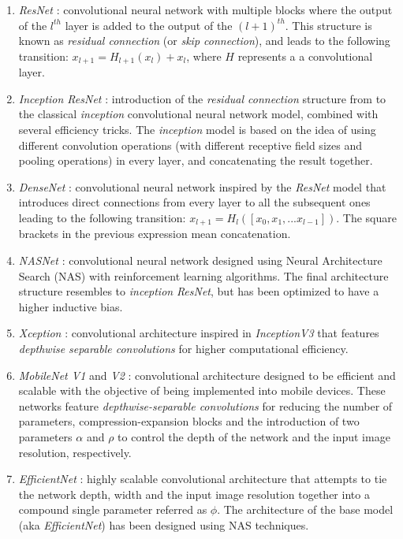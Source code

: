 \documentclass{elsarticle}
\begin{document}
    \begin{enumerate}
    	\item \textit{ResNet} \citep{he2016}: convolutional neural network with multiple blocks where the output of the $l^{th}$ layer is added to the output of the $(l+1)^{th}$. This structure is known as \textit{residual connection} (or \textit{skip connection}), and leads to the following transition: $x_{l+1} = H_{l+1}(x_{l}) + x_l$, where $H$ represents a a convolutional layer.
    	\item \textit{Inception ResNet} \citep{szegedy2017}: introduction of the \textit{residual connection} structure from \citep{he2016} to the classical \textit{inception} convolutional neural network model, combined with several efficiency tricks. The \textit{inception} model is based on the idea of using different convolution operations (with different receptive field sizes and pooling operations) in every layer, and concatenating the result together.
    	\item \textit{DenseNet} \citep{huang2017}: convolutional neural network inspired by the \textit{ResNet} model \citep{he2016} that introduces direct connections from every layer to all the subsequent ones leading to the following transition: $x_{l+1} = H_l([x_0, x_1, ... x_{l-1}])$. The square brackets in the previous expression mean concatenation.
    	\item \textit{NASNet} \citep{pham2018}: convolutional neural network designed using Neural Architecture Search (NAS) with reinforcement learning algorithms. The final architecture structure resembles to \textit{inception} \textit{ResNet}, but has been optimized to have a higher inductive bias.
    	\item \textit{Xception} \citep{chollet2017}: convolutional architecture inspired in \textit{InceptionV3}  \citep{szegedy2016} that features \textit{depthwise separable convolutions} for higher computational efficiency.
    	\item \textit{MobileNet V1} and \textit{V2} \citep{howard2017, sandler2018}: convolutional architecture designed to be efficient and scalable with the objective of being implemented into mobile devices. These networks feature \textit{depthwise-separable convolutions} for reducing the number of parameters, compression-expansion blocks and the introduction of two parameters $\alpha$ and $\rho$ to control the depth of the network and the input image resolution, respectively.
    	\item \textit{EfficientNet} \citep{tan2019}: highly scalable convolutional architecture that attempts to tie the network depth, width and the input image resolution  together into a compound single parameter referred as $\phi$. The architecture of the base model (aka \textit{EfficientNet}) has been designed using NAS techniques.
    \end{enumerate}
\end{document}
